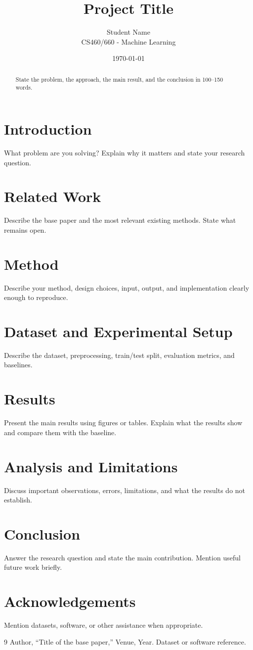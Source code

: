 \documentclass[10pt,twocolumn]{article}
\title{Project Title}
\author{Student Name \\ CS460/660 - Machine Learning}
\date{\today}
\begin{document}
\maketitle

\begin{abstract}
State the problem, the approach, the main result, and the conclusion in 100--150 words.
\end{abstract}

\section{Introduction}
What problem are you solving? Explain why it matters and state your research question.

\section{Related Work}
Describe the base paper and the most relevant existing methods. State what remains open.

\section{Method}
Describe your method, design choices, input, output, and implementation clearly enough to reproduce.

\section{Dataset and Experimental Setup}
Describe the dataset, preprocessing, train/test split, evaluation metrics, and baselines.

\section{Results}
Present the main results using figures or tables. Explain what the results show and compare them with the baseline.

\section{Analysis and Limitations}
Discuss important observations, errors, limitations, and what the results do not establish.

\section{Conclusion}
Answer the research question and state the main contribution. Mention useful future work briefly.

\section*{Acknowledgements}
Mention datasets, software, or other assistance when appropriate.

\begin{thebibliography}{9}
Author, ``Title of the base paper,'' Venue, Year.
Dataset or software reference.
\end{thebibliography}
\end{document}
